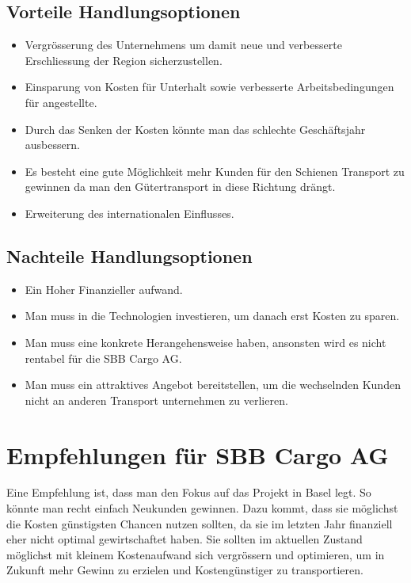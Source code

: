 \documentclass{article}
\begin{document}
\subsection{Vorteile Handlungsoptionen}
\begin{itemize}
    \item Vergrösserung des Unternehmens um damit neue und verbesserte Erschliessung der Region sicherzustellen. 
    \item Einsparung von Kosten für Unterhalt sowie verbesserte Arbeitsbedingungen für angestellte. 
    \item Durch das Senken der Kosten könnte man das schlechte Geschäftsjahr ausbessern. 
    \item Es besteht eine gute Möglichkeit mehr Kunden für den Schienen Transport zu gewinnen da man den Gütertransport in diese Richtung drängt. 
    \item Erweiterung des internationalen Einflusses. 
\end{itemize}

\subsection{Nachteile Handlungsoptionen}
\begin{itemize}
    \item Ein Hoher Finanzieller aufwand.
    \item Man muss in die Technologien investieren, um danach erst Kosten zu sparen. 
    \item Man muss eine konkrete Herangehensweise haben, ansonsten wird es nicht rentabel für die SBB Cargo AG.
    \item Man muss ein attraktives Angebot bereitstellen, um die wechselnden Kunden nicht an anderen Transport unternehmen zu verlieren.
\end{itemize}

\section{Empfehlungen für SBB Cargo AG}

Eine Empfehlung ist, dass man den Fokus auf das Projekt in Basel legt. So könnte man recht einfach Neukunden gewinnen.
Dazu kommt, dass sie möglichst die Kosten günstigsten Chancen nutzen sollten, da sie im letzten Jahr finanziell eher nicht optimal gewirtschaftet haben.
Sie sollten im aktuellen Zustand möglichst mit kleinem Kostenaufwand sich vergrössern und optimieren, um in Zukunft mehr Gewinn zu erzielen und Kostengünstiger zu transportieren.
\end{document}
